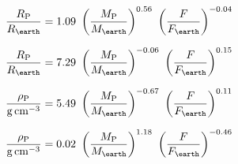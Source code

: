 \documentclass{aastex}
\newcommand{\rcoeffs}{\ensuremath{1.09~}}
\newcommand{\mcoeffs}{\ensuremath{0.56~}}
\newcommand{\fcoeffs}{\ensuremath{-0.04~}}
\newcommand{\rcoeffg}{\ensuremath{7.29~}}
\newcommand{\mcoeffg}{\ensuremath{-0.06~}}
\newcommand{\fcoeffg}{\ensuremath{0.15~}}
\newcommand{\dcoeffs}{\ensuremath{5.49~}}
\newcommand{\mdcoeffs}{\ensuremath{-0.67~}}
\newcommand{\fdcoeffs}{\ensuremath{0.11~}}
\newcommand{\dcoeffg}{\ensuremath{0.02~}}
\newcommand{\mdcoeffg}{\ensuremath{1.18~}}
\newcommand{\fdcoeffg}{\ensuremath{-0.46~}}
\begin{document}
\begin{equation}
\frac{\rpl}{\rearth} = \rcoeffs \left(\frac{\mpl}{\mearth}\right)^{\mcoeffs} \left(\frac{F}{F_\earth}\right)^{\fcoeffs}
\end{equation}

\begin{equation}
\frac{\rpl}{\rearth} = \rcoeffg \left(\frac{\mpl}{\mearth}\right)^{\mcoeffg} \left(\frac{F}{F_\earth}\right)^{\fcoeffg}
\end{equation}

\begin{equation}
\frac{\rhopl}{\gcc} = \dcoeffs \left(\frac{\mpl}{\mearth}\right)^{\mdcoeffs} \left(\frac{F}{F_\earth}\right)^{\fdcoeffs}
\end{equation}

\begin{equation}
\frac{\rhopl}{\gcc} = \dcoeffg \left(\frac{\mpl}{\mearth}\right)^{\mdcoeffg}\left(\frac{F}{F_\earth}\right)^{\fdcoeffg}
\end{equation}
\end{document}
